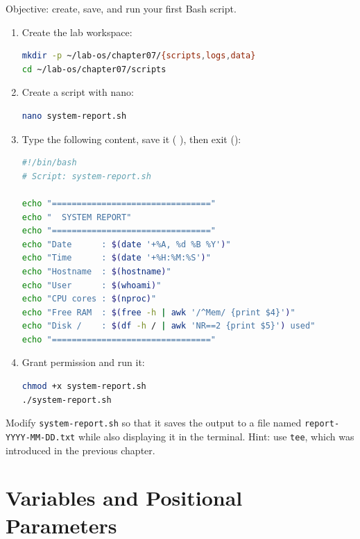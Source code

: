 Objective: create, save, and run your first Bash script.

\begin{enumerate}
  \item Create the lab workspace:
\begin{lstlisting}[language=bash, caption={Preparing the workspace}]
mkdir -p ~/lab-os/chapter07/{scripts,logs,data}
cd ~/lab-os/chapter07/scripts
\end{lstlisting}

  \item Create a script with nano:
\begin{lstlisting}[language=bash, caption={Opening nano}]
nano system-report.sh
\end{lstlisting}

  \item Type the following content, save it (
    ), then exit ():
\begin{lstlisting}[language=bash, caption={Contents of system-report.sh}]
#!/bin/bash
# Script: system-report.sh

echo "================================"
echo "  SYSTEM REPORT"
echo "================================"
echo "Date      : $(date '+%A, %d %B %Y')"
echo "Time      : $(date '+%H:%M:%S')"
echo "Hostname  : $(hostname)"
echo "User      : $(whoami)"
echo "CPU cores : $(nproc)"
echo "Free RAM  : $(free -h | awk '/^Mem/ {print $4}')"
echo "Disk /    : $(df -h / | awk 'NR==2 {print $5}') used"
echo "================================"
\end{lstlisting}

  \item Grant permission and run it:
\begin{lstlisting}[language=bash, caption={Running the script}]
chmod +x system-report.sh
./system-report.sh
\end{lstlisting}
\end{enumerate}

\begin{exercisebox}[Exercise 7.1]
Modify \texttt{system-report.sh} so that it saves the output to a file named
\texttt{report-YYYY-MM-DD.txt} while also displaying it in the terminal.
Hint: use \texttt{tee}, which was introduced in the previous chapter.
\end{exercisebox}

\section{Variables and Positional Parameters}
\label{sec:variables-parameters}

